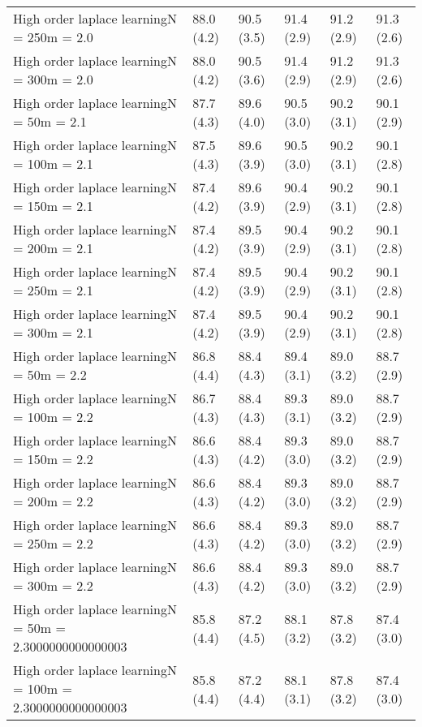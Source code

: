 \documentclass{article}
\begin{document}
\begin{table*}[t!]
\begin{center}
\begin{small}
\begin{sc}
\begin{tabular}{llllll}
High order laplace learningN = 250m = 2.0&88.0 (4.2)      &90.5 (3.5)      &91.4 (2.9)      &91.2 (2.9)      &91.3 (2.6)      \\
High order laplace learningN = 300m = 2.0&88.0 (4.2)      &90.5 (3.6)      &91.4 (2.9)      &91.2 (2.9)      &91.3 (2.6)      \\
High order laplace learningN = 50m = 2.1&87.7 (4.3)      &89.6 (4.0)      &90.5 (3.0)      &90.2 (3.1)      &90.1 (2.9)      \\
High order laplace learningN = 100m = 2.1&87.5 (4.3)      &89.6 (3.9)      &90.5 (3.0)      &90.2 (3.1)      &90.1 (2.8)      \\
High order laplace learningN = 150m = 2.1&87.4 (4.2)      &89.6 (3.9)      &90.4 (2.9)      &90.2 (3.1)      &90.1 (2.8)      \\
High order laplace learningN = 200m = 2.1&87.4 (4.2)      &89.5 (3.9)      &90.4 (2.9)      &90.2 (3.1)      &90.1 (2.8)      \\
High order laplace learningN = 250m = 2.1&87.4 (4.2)      &89.5 (3.9)      &90.4 (2.9)      &90.2 (3.1)      &90.1 (2.8)      \\
High order laplace learningN = 300m = 2.1&87.4 (4.2)      &89.5 (3.9)      &90.4 (2.9)      &90.2 (3.1)      &90.1 (2.8)      \\
High order laplace learningN = 50m = 2.2&86.8 (4.4)      &88.4 (4.3)      &89.4 (3.1)      &89.0 (3.2)      &88.7 (2.9)      \\
High order laplace learningN = 100m = 2.2&86.7 (4.3)      &88.4 (4.3)      &89.3 (3.1)      &89.0 (3.2)      &88.7 (2.9)      \\
High order laplace learningN = 150m = 2.2&86.6 (4.3)      &88.4 (4.2)      &89.3 (3.0)      &89.0 (3.2)      &88.7 (2.9)      \\
High order laplace learningN = 200m = 2.2&86.6 (4.3)      &88.4 (4.2)      &89.3 (3.0)      &89.0 (3.2)      &88.7 (2.9)      \\
High order laplace learningN = 250m = 2.2&86.6 (4.3)      &88.4 (4.2)      &89.3 (3.0)      &89.0 (3.2)      &88.7 (2.9)      \\
High order laplace learningN = 300m = 2.2&86.6 (4.3)      &88.4 (4.2)      &89.3 (3.0)      &89.0 (3.2)      &88.7 (2.9)      \\
High order laplace learningN = 50m = 2.3000000000000003&85.8 (4.4)      &87.2 (4.5)      &88.1 (3.2)      &87.8 (3.2)      &87.4 (3.0)      \\
High order laplace learningN = 100m = 2.3000000000000003&85.8 (4.4)      &87.2 (4.4)      &88.1 (3.1)      &87.8 (3.2)      &87.4 (3.0)      \\

\end{tabular}
\end{sc}
\end{small}
\end{center}
\end{table*}
\end{document}
